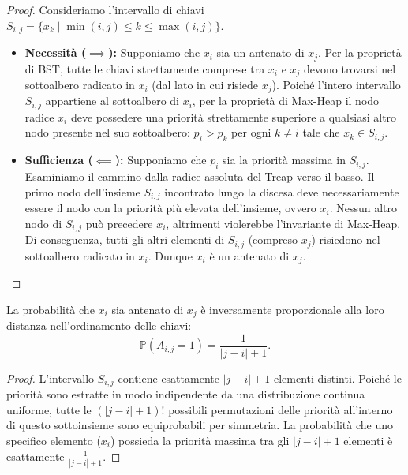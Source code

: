 \begin{proof}
Consideriamo l'intervallo di chiavi $S_{i, j} = \{x_k \mid \min(i, j) \le k \le \max(i, j)\}$.
\begin{itemize}
    \item \textbf{Necessit\`a ($\implies$):} Supponiamo che $x_i$ sia un antenato di $x_j$. Per la propriet\`a di BST, tutte le chiavi strettamente comprese tra $x_i$ e $x_j$ devono trovarsi nel sottoalbero radicato in $x_i$ (dal lato in cui risiede $x_j$). Poich\'e l'intero intervallo $S_{i, j}$ appartiene al sottoalbero di $x_i$, per la propriet\`a di Max-Heap il nodo radice $x_i$ deve possedere una priorit\`a strettamente superiore a qualsiasi altro nodo presente nel suo sottoalbero: $p_i > p_k$ per ogni $k \neq i$ tale che $x_k \in S_{i, j}$.
    
    \item \textbf{Sufficienza ($\impliedby$):} Supponiamo che $p_i$ sia la priorit\`a massima in $S_{i, j}$. Esaminiamo il cammino dalla radice assoluta del Treap verso il basso. Il primo nodo dell'insieme $S_{i, j}$ incontrato lungo la discesa deve necessariamente essere il nodo con la priorit\`a pi\`u elevata dell'insieme, ovvero $x_i$. Nessun altro nodo di $S_{i, j}$ pu\`o precedere $x_i$, altrimenti violerebbe l'invariante di Max-Heap. Di conseguenza, tutti gli altri elementi di $S_{i, j}$ (compreso $x_j$) risiedono nel sottoalbero radicato in $x_i$. Dunque $x_i$ \`e un antenato di $x_j$.
\end{itemize}
\end{proof}

\begin{lemma}
La probabilit\`a che $x_i$ sia antenato di $x_j$ \`e inversamente proporzionale alla loro distanza nell'ordinamento delle chiavi:
\begin{equation}
  \mathbb{P}(A_{i, j} = 1) = \frac{1}{|j - i| + 1}.
\end{equation}
\end{lemma}

\begin{proof}
L'intervallo $S_{i, j}$ contiene esattamente $|j - i| + 1$ elementi distinti. Poich\'e le priorit\`a sono estratte in modo indipendente da una distribuzione continua uniforme, tutte le $(|j - i| + 1)!$ possibili permutazioni delle priorit\`a all'interno di questo sottoinsieme sono equiprobabili per simmetria. La probabilit\`a che uno specifico elemento ($x_i$) possieda la priorit\`a massima tra gli $|j - i| + 1$ elementi \`e esattamente $\frac{1}{|j - i| + 1}$.
\end{proof}

